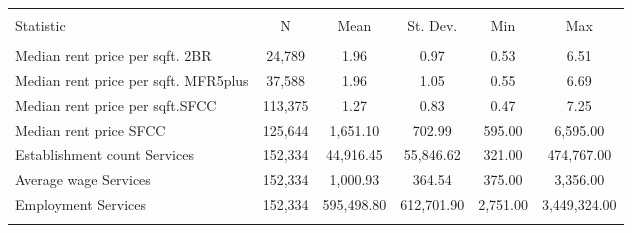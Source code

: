 
\begin{tabular}{@{\extracolsep{5pt}}lccccc} 
\\[-1.8ex]\hline 
\hline \\[-1.8ex] 
Statistic & \multicolumn{1}{c}{N} & \multicolumn{1}{c}{Mean} & \multicolumn{1}{c}{St. Dev.} & \multicolumn{1}{c}{Min} & \multicolumn{1}{c}{Max} \\ 
\hline \\[-1.8ex] 
Median rent price per sqft. 2BR & 24,789 & 1.96 & 0.97 & 0.53 & 6.51 \\ 
Median rent price per sqft. MFR5plus & 37,588 & 1.96 & 1.05 & 0.55 & 6.69 \\ 
Median rent price per sqft.SFCC & 113,375 & 1.27 & 0.83 & 0.47 & 7.25 \\ 
Median rent price SFCC & 125,644 & 1,651.10 & 702.99 & 595.00 & 6,595.00 \\ 
Establishment count Services & 152,334 & 44,916.45 & 55,846.62 & 321.00 & 474,767.00 \\ 
Average wage Services & 152,334 & 1,000.93 & 364.54 & 375.00 & 3,356.00 \\ 
Employment Services & 152,334 & 595,498.80 & 612,701.90 & 2,751.00 & 3,449,324.00 \\ 
\hline \\[-1.8ex] 
\end{tabular} 
